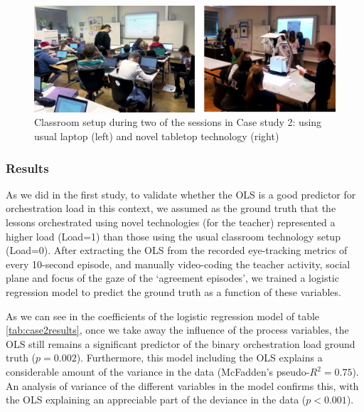 \documentclass[10pt,journal,compsoc]{IEEEtran}
\begin{document}
\begin{figure}[!t]
\centering
\includegraphics[width=\linewidth]{img/Case2Picture}
\caption{Classroom setup during two of the sessions in Case study 2: using usual laptop (left) and novel tabletop technology (right)}
\label{fig:case2picture}
\end{figure}

\subsubsection{Results}

As we did in the first study, to validate whether the OLS is a good predictor for orchestration load in this context, we assumed as the ground truth that the lessons orchestrated using novel technologies (for the teacher) represented a higher load (Load=1) than those using the usual classroom technology setup (Load=0). After extracting the OLS from the recorded eye-tracking metrics of every 10-second episode, and manually video-coding the teacher activity, social plane and focus of the gaze of the `agreement episodes', we trained a logistic regression model to predict the ground truth as a function of these variables.

As we can see in the coefficients of the logistic regression model of table \ref{tab:case2results}, once we take away the influence of the process variables, the OLS still remains a significant predictor of the binary orchestration load ground truth ($p=0.002$). Furthermore, this model including the OLS explains a considerable amount of the variance in the data (McFadden's pseudo-$R^2=0.75$). An analysis of variance of the different variables in the model confirms this, with the OLS explaining an appreciable part of the deviance in the data ($p<0.001$). 
\end{document}
